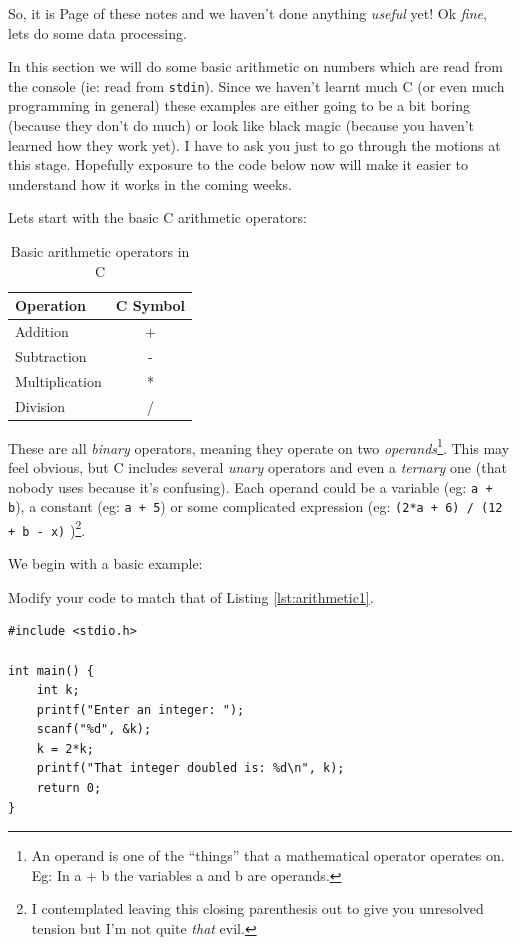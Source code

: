 \documentclass{lab}
\begin{document}
So, it is Page \thepage{} of these notes and we haven't done anything \textit{useful} yet! Ok \textit{fine}, lets do some data processing.

In this section we will do some basic arithmetic on numbers which are read from the console (ie: read from \texttt{stdin}). Since we haven't learnt much C (or even much programming in general) these examples are either going to be a bit boring (because they don't do much) or look like black magic (because you haven't learned how they work yet). I have to ask you just to go through the motions at this stage. Hopefully exposure to the code below now will make it easier to understand how it works in the coming weeks.

Lets start with the basic C arithmetic operators:

\begin{table}[H]
\centering
\begin{tabular}{|l|c|}
\hline
Operation      & C Symbol \\
\hline
Addition       & +        \\
Subtraction    & -        \\
Multiplication & *        \\
Division       & /       \\
\hline
\end{tabular}
\caption{Basic arithmetic operators in C}
\end{table}

These are all \textit{binary} operators, meaning they operate on two \textit{operands}\footnote{An operand is one of the ``things'' that a mathematical operator operates on. Eg: In a + b the variables a and b are operands.}. This may feel obvious, but C includes several \textit{unary} operators and even a \textit{ternary} one (that nobody uses because it's confusing). Each operand could be a variable (eg: \texttt{a + b}), a constant (eg: \texttt{a + 5}) or some complicated expression (eg: \texttt{(2*a + 6) / (12 + b - x)} )\footnote{I contemplated leaving this closing parenthesis out to give you unresolved tension but I'm not quite \textit{that} evil.}.

We begin with a basic example:

\begin{task}{}{}
Modify your code to match that of Listing \ref{lst:arithmetic1}.

\begin{lstlisting}[style=CStyle,caption=A basic arithmetic example,label=lst:arithmetic1]
#include <stdio.h>

int main() {
	int k;
	printf("Enter an integer: ");
	scanf("%d", &k);
	k = 2*k;
	printf("That integer doubled is: %d\n", k);
	return 0;
}
\end{lstlisting}
\end{task}
\end{document}
